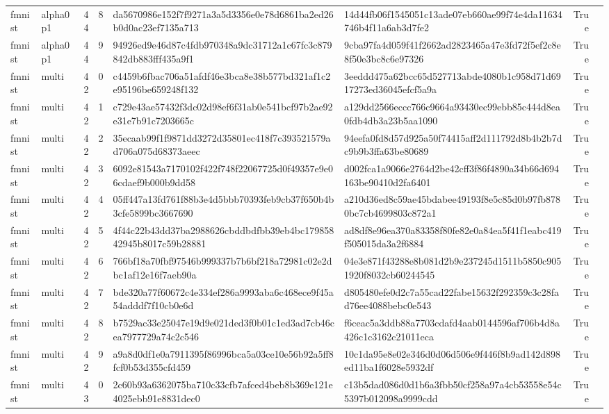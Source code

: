 \begin{tabular}{llrrllrl}
fmnist & alpha0p1 & 44 & 8 & da5670986e152f7f9271a3a5d3356e0e78d6861ba2ed26b0d0ac23ef7135a713 & 14d44fb06f1545051c13ade07eb660ae99f74e4da11634746b4f11a6ab3d7fe2 & True &  \\
fmnist & alpha0p1 & 44 & 9 & 94926ed9e46d87c4fdb970348a9dc31712a1c67fc3c879842db883fff435a9f1 & 9cba97fa4d059f41f2662ad2823465a47e3fd72f5ef2c8e8f50e3bc8c6e97326 & True &  \\
fmnist & multi & 42 & 0 & c4459b6fbac706a51afdf46e3bca8e38b577bd321af1c2e95196be659248f132 & 3eeddd475a62bcc65d527713abde4080b1c958d71d6917273ed36045efcf5a9a & True &  \\
fmnist & multi & 42 & 1 & c729e43ae57432f3dc02d98ef6f31ab0e541bcf97b2ae92e31e7b91c7203665c & a129dd2566eccc766c9664a93430ec99ebb85c444d8ea0fdb4db3a23b5aa1090 & True &  \\
fmnist & multi & 42 & 2 & 35ecaab99f1f9871dd3272d35801ec418f7c393521579ad706a075d68373aeec & 94eefa0fd8d57d925a50f74415aff2d111792d8b4b2b7dc9b9b3ffa63be80689 & True &  \\
fmnist & multi & 42 & 3 & 6092e81543a7170102f422f748f22067725d0f49357e9e06cdaef9b000b9dd58 & d002fca1a9066e2764d2be42cff3f86f4890a34b66d694163be90410d2fa6401 & True &  \\
fmnist & multi & 42 & 4 & 05ff447a13fd761f88b3e4d5bbb70393feb9cb37f650b4b3cfe5899bc3667690 & a210d36ed8c59ae45bdabee49193f8e5c85d0b97fb8780bc7cb4699803c872a1 & True &  \\
fmnist & multi & 42 & 5 & 4f44c22b43dd37ba2988626cbddbdfbb39eb4bc17985842945b8017c59b28881 & ad8df8e96ea370a83358f80fe82e0a84ea5f41f1eabc419f505015da3a2f6884 & True &  \\
fmnist & multi & 42 & 6 & 766bf18a70fbf97546b999337b7b6bf218a72981c02e2dbc1af12e16f7aeb90a & 04e3e871f43288e8b081d2b9e237245d1511b5850c9051920f8032cb60244545 & True &  \\
fmnist & multi & 42 & 7 & bde320a77f60672c4e334ef286a9993aba6c468ece9f45a54adddf7f10cb0e6d & d805480efe0d2c7a55cad22fabe15632f292359c3c28fad76ee4088bebc0e543 & True &  \\
fmnist & multi & 42 & 8 & b7529ac33e25047e19d9e021ded3f0b01c1ed3ad7cb46cea7977729a74c2c546 & f6ceac5a3ddb88a7703cdafd4aab0144596af706b4d8a426c1c3162c21011eca & True &  \\
fmnist & multi & 42 & 9 & a9a8d0df1e0a7911395f86996bca5a03ce10e56b92a5ff8fcf0b53d355cfd459 & 10c1da95e8e02e346d0d06d506e9f446f8b9ad142d898ed11ba1f6028e5932df & True &  \\
fmnist & multi & 43 & 0 & 2c60b93a6362075ba710c33cfb7afced4beb8b369e121e4025ebb91e8831dec0 & c13b5dad086d0d1b6a3fbb50cf258a97a4cb53558e54c5397b012098a9999cdd & True &  \\

\end{tabular}
